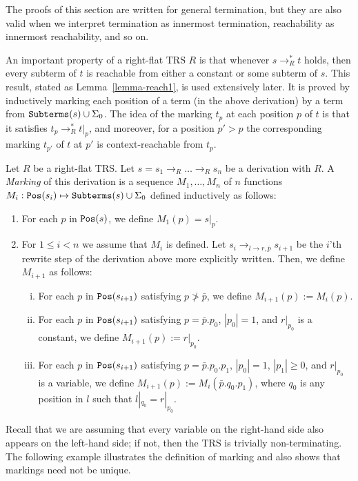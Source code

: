 \documentclass{LMCS}
\theoremstyle{plain}
\newcommand\subterms[1]{{{\tt Subterms}(}{#1}{)}}
\newcommand\Pos{{\tt Pos}}
\begin{document}
The proofs of this section are
written for general termination, but they are also valid
when we interpret termination as innermost termination,
reachability as innermost reachability, and so on.

An important property of a right-flat TRS $R$ is that
whenever $s \rightarrow_R^* t$ holds, then every subterm of $t$ is
reachable from either a constant or some subterm of $s$.
This result, stated as Lemma~\ref{lemma-reach1}, is 
used extensively later.  It is proved 
by inductively 
marking each position of a term (in the above derivation) by
a term from $\subterms{s}\cup\Sigma_0$. The idea of
the marking $t_p$ at each position $p$ of $t$ is that
it satisfies $t_p\rightarrow_R^* t|_p$, and moreover,
for a position $p'>p$ the corresponding marking
$t_{p'}$ of $t$ at $p'$ is context-reachable
from $t_p$.

\begin{defi}
Let $R$ be a right-flat TRS.
Let $s=s_1\to_R\ldots\to_Rs_n$ be a derivation with $R$.
A {\em Marking} of this derivation is a sequence
$M_1,\ldots,M_n$ of $n$ functions
$M_i:\Pos(s_i)\mapsto \subterms{s}\cup\Sigma_0$
defined inductively as follows:
\begin{enumerate}[$\bullet$]
\item For each $p$ in ${\tt Pos}(s)$, we define $M_1(p)=s|_p$.
\item For $1\leq i< n$ we assume that $M_i$ 
is defined. Let $s_i\to_{l\to r,\bar{p}}s_{i+1}$ be the $i$'th
rewrite step of the derivation above more explicitly written. Then,
we define $M_{i+1}$ as follows:
\begin{enumerate}[(i)]
\item For each $p$ in ${\tt Pos}(s_{i+1})$
satisfying $p\not> \bar{p}$, we define $M_{i+1}(p) := M_i(p)$.
\item For each $p$ in ${\tt Pos}(s_{i+1})$
satisfying $p=\bar{p}.p_0$, $|p_0|=1$, and $r|_{p_0}$ is a constant, 
we define $M_{i+1}(p) := r|_{p_0}$.
\item For each $p$ in ${\tt Pos}(s_{i+1})$ 
satisfying $p = \bar{p}.p_0.p_1$, $|p_0|=1$, $|p_1|\geq 0$, and $r|_{p_0}$ is a variable,
we define $M_{i+1}(p) := M_i(\bar{p}.q_0.p_1)$, where
$q_0$ is any position in $l$ such that $l|_{q_0} = r|_{p_0}$.
\end{enumerate}
\end{enumerate}
\end{defi}


\noindent Recall that we are assuming that every variable on the right-hand
side also appears on the left-hand side; if not, then the TRS
is trivially non-terminating.
The following example illustrates the definition of marking and
also shows that markings need not be unique.
\end{document}
